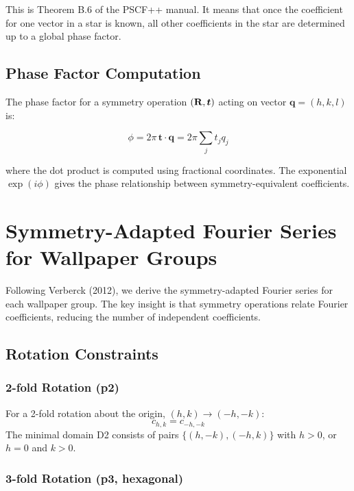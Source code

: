 This is Theorem B.6 of the PSCF++ manual. It means that once the coefficient for one vector in a star is known, all other coefficients in the star are determined up to a global phase factor.

\subsection{Phase Factor Computation}

The phase factor for a symmetry operation $(\mathbf{R}, \boldsymbol{t})$ acting on vector $\boldsymbol{q} = (h, k, l)$ is:

\begin{equation}
    \phi = 2\pi \, \boldsymbol{t} \cdot \boldsymbol{q} = 2\pi \sum_{j} t_j q_j
\end{equation}

where the dot product is computed using fractional coordinates. The exponential $\exp(i\phi)$ gives the phase relationship between symmetry-equivalent coefficients.

\section{Symmetry-Adapted Fourier Series for Wallpaper Groups}

Following Verberck (2012), we derive the symmetry-adapted Fourier series for each wallpaper group. The key insight is that symmetry operations relate Fourier coefficients, reducing the number of independent coefficients.

\subsection{Rotation Constraints}

\subsubsection{2-fold Rotation (p2)}

For a 2-fold rotation about the origin, $(h,k) \to (-h,-k)$:
\begin{equation}
    c_{h,k} = c_{-h,-k}
\end{equation}
The minimal domain D2 consists of pairs $\{(h,-k), (-h,k)\}$ with $h > 0$, or $h=0$ and $k > 0$.

\subsubsection{3-fold Rotation (p3, hexagonal)}

